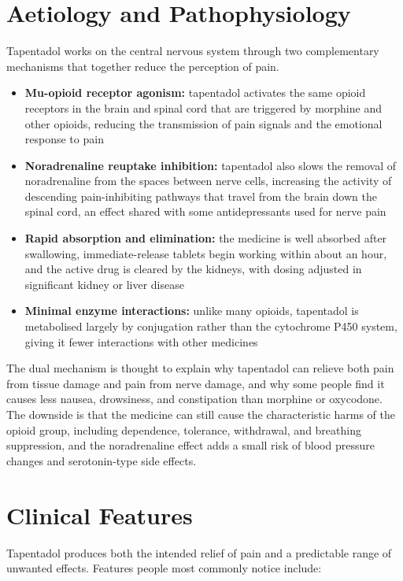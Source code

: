 \section*{Aetiology and Pathophysiology}
Tapentadol works on the central nervous system through two complementary mechanisms that together reduce the perception of pain.

\begin{itemize}
    \item \textbf{Mu-opioid receptor agonism:} tapentadol activates the same opioid receptors in the brain and spinal cord that are triggered by morphine and other opioids, reducing the transmission of pain signals and the emotional response to pain
    \item \textbf{Noradrenaline reuptake inhibition:} tapentadol also slows the removal of noradrenaline from the spaces between nerve cells, increasing the activity of descending pain-inhibiting pathways that travel from the brain down the spinal cord, an effect shared with some antidepressants used for nerve pain
    \item \textbf{Rapid absorption and elimination:} the medicine is well absorbed after swallowing, immediate-release tablets begin working within about an hour, and the active drug is cleared by the kidneys, with dosing adjusted in significant kidney or liver disease
    \item \textbf{Minimal enzyme interactions:} unlike many opioids, tapentadol is metabolised largely by conjugation rather than the cytochrome P450 system, giving it fewer interactions with other medicines
\end{itemize}

The dual mechanism is thought to explain why tapentadol can relieve both pain from tissue damage and pain from nerve damage, and why some people find it causes less nausea, drowsiness, and constipation than morphine or oxycodone. The downside is that the medicine can still cause the characteristic harms of the opioid group, including dependence, tolerance, withdrawal, and breathing suppression, and the noradrenaline effect adds a small risk of blood pressure changes and serotonin-type side effects.

\section*{Clinical Features}
Tapentadol produces both the intended relief of pain and a predictable range of unwanted effects. Features people most commonly notice include:

